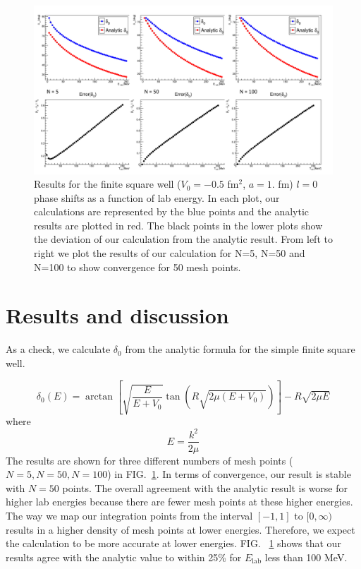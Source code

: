 \documentclass[10pt,showpacs,preprintnumbers,footinbib,amsmath,amssymb,aps,prl,twocolumn,groupedaddress,superscriptaddress,showkeys]{revtex4-1}
\begin{document}
\begin{figure}
	\includegraphics[width=\textwidth]{figures/stability.pdf}
	\caption{Results for the finite square well ($V_0 = -0.5$ fm$^2$, $a = 1.$ fm) $l=0$
	phase shifts  as a function of lab energy. In each plot, our calculations are represented by the
	blue points and the analytic results are plotted in red. The black points in the lower plots
	show the deviation of our calculation from the analytic result. From left to right we plot the
	results of our calculation for N=5, N=50 and N=100 to show convergence for 50 mesh points.}
	\label{fig:analyticDelta}
\end{figure}


\section{Results and discussion}

As a check, we calculate $\delta _0$ from the analytic formula for the simple finite square
well.

\begin{equation}
	\delta _0(E) = \arctan \left [ \sqrt{\frac{E}{E+V_0}} \tan \left ( R \sqrt{2 \mu (E + V_0)}
 \right ) \right ] - R \sqrt{2 \mu E}
	\label{eq:deltaAnalytic}
\end{equation}
where
\begin{equation*}
	E = \frac{k^2}{2 \mu}
\end{equation*}
The results are shown for three different numbers of mesh points ($N=5,N=50,N=100$) in
FIG.~\ref{fig:analyticDelta}. In terms of convergence, our result is stable with $N=50$ points.
The overall agreement with the analytic result is worse for higher lab energies because there
are fewer mesh points at these higher energies. The way we map our integration points from
the interval $[-1,1]$ to $[0,\infty)$ results in a higher density of mesh points at lower energies.
Therefore, we expect the calculation to be more accurate at lower energies. FIG.~
\ref{fig:analyticDelta}
shows that our results agree with the analytic value to within 25\% for $E_{\mathrm{lab}}$ less
than 100 MeV.
\end{document}
